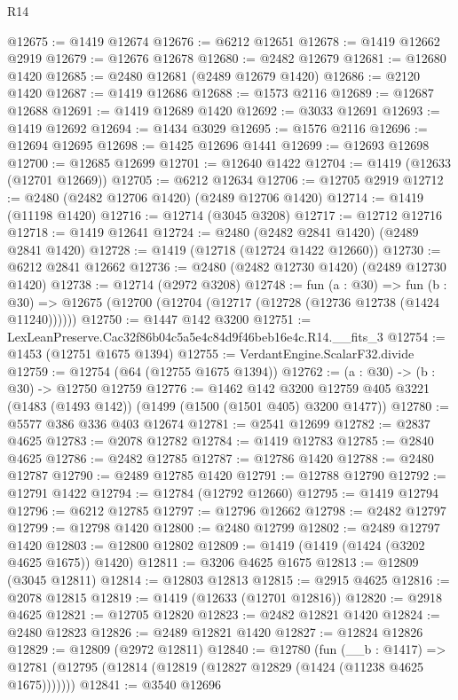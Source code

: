 \begin{lexlean}{R14}
\begin{coremodule}
@12675 := @1419 @12674
@12676 := @6212 @12651
@12678 := @1419 @12662 @2919
@12679 := @12676 @12678
@12680 := @2482 @12679
@12681 := @12680 @1420
@12685 := @2480 @12681 (@2489 @12679 @1420)
@12686 := @2120 @1420
@12687 := @1419 @12686
@12688 := @1573 @2116
@12689 := @12687 @12688
@12691 := @1419 @12689 @1420
@12692 := @3033 @12691
@12693 := @1419 @12692
@12694 := @1434 @3029
@12695 := @1576 @2116
@12696 := @12694 @12695
@12698 := @1425 @12696 @1441
@12699 := @12693 @12698
@12700 := @12685 @12699
@12701 := @12640 @1422
@12704 := @1419 (@12633 (@12701 @12669))
@12705 := @6212 @12634
@12706 := @12705 @2919
@12712 := @2480 (@2482 @12706 @1420) (@2489 @12706 @1420)
@12714 := @1419 (@11198 @1420)
@12716 := @12714 (@3045 @3208)
@12717 := @12712 @12716
@12718 := @1419 @12641
@12724 := @2480 (@2482 @2841 @1420) (@2489 @2841 @1420)
@12728 := @1419 (@12718 (@12724 @1422 @12660))
@12730 := @6212 @2841 @12662
@12736 := @2480 (@2482 @12730 @1420) (@2489 @12730 @1420)
@12738 := @12714 (@2972 @3208)
@12748 := fun (a : @30) =>
  fun (b : @30) => @12675 (@12700 (@12704 (@12717 (@12728 (@12736 @12738 (@1424 @11240))))))
@12750 := @1447 @142 @3200
@12751 := LexLeanPreserve.Cac32f86b04c5a5e4c84d9f46beb16e4c.R14.__fits_3
@12754 := @1453 (@12751 @1675 @1394)
@12755 := VerdantEngine.ScalarF32.divide
@12759 := @12754 (@64 (@12755 @1675 @1394))
@12762 := (a : @30) -> (b : @30) -> @12750 @12759
@12776 := @1462
    @142
    @3200
    @12759
    @405
    @3221
    (@1483 (@1493 @142))
    (@1499 (@1500 (@1501 @405) @3200 @1477))
@12780 := @5577 @386 @336 @403 @12674
@12781 := @2541 @12699
@12782 := @2837 @4625
@12783 := @2078 @12782
@12784 := @1419 @12783
@12785 := @2840 @4625
@12786 := @2482 @12785
@12787 := @12786 @1420
@12788 := @2480 @12787
@12790 := @2489 @12785 @1420
@12791 := @12788 @12790
@12792 := @12791 @1422
@12794 := @12784 (@12792 @12660)
@12795 := @1419 @12794
@12796 := @6212 @12785
@12797 := @12796 @12662
@12798 := @2482 @12797
@12799 := @12798 @1420
@12800 := @2480 @12799
@12802 := @2489 @12797 @1420
@12803 := @12800 @12802
@12809 := @1419 (@1419 (@1424 (@3202 @4625 @1675)) @1420)
@12811 := @3206 @4625 @1675
@12813 := @12809 (@3045 @12811)
@12814 := @12803 @12813
@12815 := @2915 @4625
@12816 := @2078 @12815
@12819 := @1419 (@12633 (@12701 @12816))
@12820 := @2918 @4625
@12821 := @12705 @12820
@12823 := @2482 @12821 @1420
@12824 := @2480 @12823
@12826 := @2489 @12821 @1420
@12827 := @12824 @12826
@12829 := @12809 (@2972 @12811)
@12840 := @12780
    (fun (__b : @1417) =>
    @12781 (@12795 (@12814 (@12819 (@12827 @12829 (@1424 (@11238 @4625 @1675)))))))
@12841 := @3540 @12696

\end{coremodule}
\end{lexlean}
